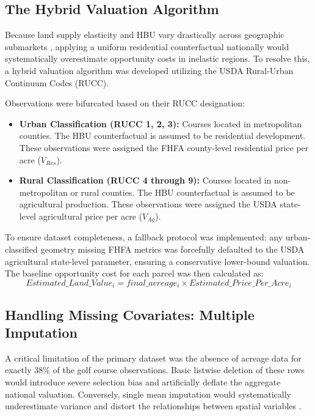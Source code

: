 \documentclass[10pt, letterpaper]{article}
\begin{document}
\subsection{The Hybrid Valuation Algorithm}
Because land supply elasticity and HBU vary drastically across geographic submarkets \parencite{Davis2008}, applying a uniform residential counterfactual nationally would systematically overestimate opportunity costs in inelastic regions. To resolve this, a hybrid valuation algorithm was developed utilizing the USDA Rural-Urban Continuum Codes (RUCC).

Observations were bifurcated based on their RUCC designation:
\begin{itemize}
    \item \textbf{Urban Classification (RUCC 1, 2, 3):} Courses located in metropolitan counties. The HBU counterfactual is assumed to be residential development. These observations were assigned the FHFA county-level residential price per acre ($V_{Res}$).
    \item \textbf{Rural Classification (RUCC 4 through 9):} Courses located in non-metropolitan or rural counties. The HBU counterfactual is assumed to be agricultural production. These observations were assigned the USDA state-level agricultural price per acre ($V_{Ag}$).
\end{itemize}
To ensure dataset completeness, a fallback protocol was implemented: any urban-classified geometry missing FHFA metrics was forcefully defaulted to the USDA agricultural state-level parameter, ensuring a conservative lower-bound valuation. The baseline opportunity cost for each parcel was then calculated as:
\begin{equation}
    Estimated\_Land\_Value_i = final\_acreage_i \times Estimated\_Price\_Per\_Acre_i
\end{equation}

\subsection{Handling Missing Covariates: Multiple Imputation}
A critical limitation of the primary dataset was the absence of acreage data for exactly 38\% of the golf course observations. Basic listwise deletion of these rows would introduce severe selection bias and artificially deflate the aggregate national valuation. Conversely, single mean imputation would systematically underestimate variance and distort the relationships between spatial variables \parencite{Burren2018}.
\end{document}

